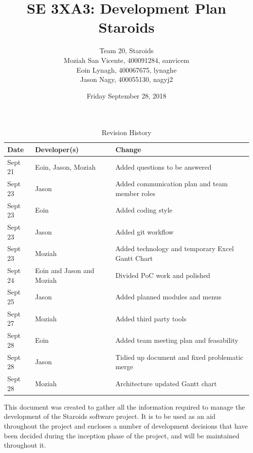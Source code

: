 \documentclass{article}
\title{SE 3XA3: Development Plan\\Staroids}
\author{Team 20, Staroids
		\\ Moziah San Vicente, 400091284, sanvicem
		\\ Eoin Lynagh, 400067675, lynaghe
		\\ Jason Nagy, 400055130, nagyj2
}
\date{Friday September 28, 2018}
\begin{document}
\begin{table}[hp]
\caption{Revision History} \label{TblRevisionHistory}
\begin{tabularx}{\textwidth}{llX}
\toprule
\textbf{Date} & \textbf{Developer(s)} & \textbf{Change}\\
\midrule
Sept 21 & Eoin, Jason, Moziah & Added questions to be answered\\
Sept 23 & Jason & Added communication plan and team member roles\\
Sept 23 & Eoin & Added coding style\\
Sept 23 & Jason & Added git workflow\\
Sept 23 & Moziah & Added technology and temporary Excel Gantt Chart\\
Sept 24 & Eoin and Jason and Moziah & Divided PoC work and polished\\
Sept 25 & Jason & Added planned modules and menus\\
Sept 27 & Moziah & Added third party tools\\
Sept 28 & Eoin & Added team meeting plan and feasability\\
Sept 28 & Jason & Tidied up document and fixed problematic merge\\
Sept 28 & Moziah & Architecture updated Gantt chart\\
\bottomrule
\end{tabularx}
\end{table}

\newpage

\maketitle

This document was created to gather all the information required to manage the development of the Staroids software project. It is to be used as an aid throughout the project and encloses a number of development decisions that have been decided during the inception phase of the project, and will be maintained throughout it.
\end{document}
